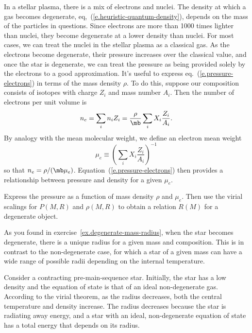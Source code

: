 In a stellar plasma, there is a mix of electrons and nuclei. The density at which a gas becomes degenerate, eq,~(\ref{e.heuristic-quantum-density}), depends on the mass of the particles in questions. Since electrons are more than 1000 times lighter than nuclei, they become degenerate at a lower density than nuclei. For most cases, we can treat the nuclei in the stellar plasma as a classical gas. As the electrons become degenerate, their pressure increases over the classical value, and once the star is degenerate, we can treat the pressure as being provided solely by the electrons to a good approximation. It's useful to express eq.~(\ref{e.pressure-electrons}) in terms of the mass density $\rho$. To do this, suppose our composition consists of isotopes with charge $Z_{i}$ and mass number $A_{i}$. Then the number of electrons per unit volume is
\[
	n_{e} = \sum_{i} n_{i} Z_{i} = \frac{\rho}{\mb}\sum_{i} X_{i}\frac{Z_{i}}{A_{i}}.
\]
By analogy with the mean molecular weight, we define an electron mean weight
\begin{equation}\label{e.electron-mean-weight}
\mu_{e} \equiv \left(\sum_{i}X_{i}\frac{Z_{i}}{A_{i}}\right)^{-1}
\end{equation}
so that $n_{e} = \rho/(\mb\mu_{e})$. Equation~(\ref{e.pressure-electrons}) then provides a relationship between pressure and density for a given $\mu_{e}$.

\begin{exercisebox}
\label{ex.degenerate-mass-radius}
Express the pressure as a function of mass density $\rho$ and $\mu_{e}$. Then use the virial scalings for $P(M,R)$ and $\rho(M,R)$ to obtain a relation $R(M)$ for a degenerate object.
\end{exercisebox}

As you found in exercise~\ref{ex.degenerate-mass-radius}, when the star becomes degenerate, there is a unique radius for a given mass and composition. This is in contrast to the non-degenerate case, for which a star of a given mass can have a wide range of possible radii depending on the internal temperature.

Consider a contracting pre-main-sequence star. Initially, the star has a low density and the equation of state is that of an ideal non-degenerate gas. According to the virial theorem, as the radius decreases, both the central temperature and density increase. 
The radius decreases because the star is radiating away energy, and a star with an ideal, non-degenerate equation of state has a total energy that depends on its radius.

